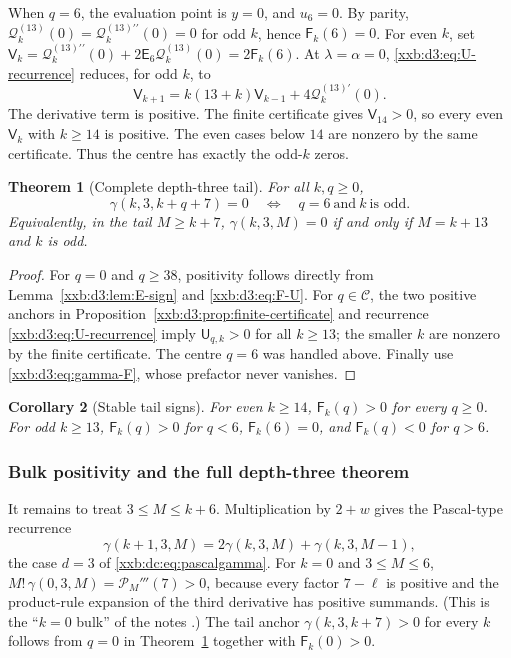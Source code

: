 \documentclass[11pt,a4paper]{article}
\numberwithin{equation}{section}
\newtheorem{theorem}{Theorem}[section]
\newtheorem{corollary}[theorem]{Corollary}
\theoremstyle{definition}
\theoremstyle{remark}
\theoremstyle{plain}
\begin{document}
When $q=6$, the evaluation point is $y=0$, and $u_6=0$.  By parity,
$\mathcal Q_k^{(13)}(0)=\mathcal Q_k^{(13)\prime\prime}(0)=0$ for odd $k$,
hence $\mathsf F_k(6)=0$.  For even $k$, set
$\mathsf V_k=\mathcal Q_k^{(13)\prime\prime}(0)+2\mathsf E_6\mathcal Q_k^{(13)}(0)=2\mathsf F_k(6)$.
At $\lambda=\alpha=0$, \eqref{xxb:d3:eq:U-recurrence} reduces, for odd $k$, to
\[
 \mathsf V_{k+1}=k(13+k)\mathsf V_{k-1}+4\mathcal Q_k^{(13)\prime}(0).
\]
The derivative term is positive.  The finite certificate gives
$\mathsf V_{14}>0$, so every even $\mathsf V_k$ with $k\geq14$ is positive.
The even cases below $14$ are nonzero by the same certificate.  Thus the
centre has exactly the odd-$k$ zeros.

\begin{theorem}[Complete depth-three tail]
\label{xxb:d3:thm:tail}
For all $k,q\geq0$,
\[
 \gamma(k,3,k+q+7)=0
 \quad\Longleftrightarrow\quad
 q=6\ \text{and}\ k\ \text{is odd}.
\]
Equivalently, in the tail $M\geq k+7$,
$\gamma(k,3,M)=0$ if and only if $M=k+13$ and $k$ is odd.
\end{theorem}

\begin{proof}
For $q=0$ and $q\geq38$, positivity follows directly from
Lemma~\ref{xxb:d3:lem:E-sign} and \eqref{xxb:d3:eq:F-U}.  For $q\in\mathcal C$,
the two positive anchors in Proposition~\ref{xxb:d3:prop:finite-certificate}
and recurrence \eqref{xxb:d3:eq:U-recurrence} imply $\mathsf U_{q,k}>0$ for
all $k\geq13$; the smaller $k$ are nonzero by the finite certificate.  The
centre $q=6$ was handled above.  Finally use \eqref{xxb:d3:eq:gamma-F}, whose
prefactor never vanishes.
\end{proof}

\begin{corollary}[Stable tail signs]
\label{xxb:d3:cor:stable-signs}
For even $k\geq14$, $\mathsf F_k(q)>0$ for every $q\geq0$.  For odd $k\geq13$,
$\mathsf F_k(q)>0$ for $q<6$, $\mathsf F_k(6)=0$, and $\mathsf F_k(q)<0$ for
$q>6$.
\end{corollary}

\subsubsection{Bulk positivity and the full depth-three theorem}\label{xxb:d3:sec:bulk}

It remains to treat $3\leq M\leq k+6$.  Multiplication by $2+w$ gives the
Pascal-type recurrence
\begin{equation}
 \label{xxb:d3:eq:gamma-k-recurrence}
 \gamma(k+1,3,M)=2\gamma(k,3,M)+\gamma(k,3,M-1),
\end{equation}
the case $d=3$ of \eqref{xxb:dc:eq:pascalgamma}.
For $k=0$ and $3\leq M\leq6$, $M!\,\gamma(0,3,M)=\mathcal P_M'''(7)>0$,
because every factor $7-\ell$ is positive and the product-rule expansion of
the third derivative has positive summands.  (This is the ``$k=0$ bulk'' of
the notes \cite{xxbd3-notes}.)  The tail anchor $\gamma(k,3,k+7)>0$ for every
$k$ follows from $q=0$ in Theorem~\ref{xxb:d3:thm:tail} together with
$\mathsf F_k(0)>0$.
\end{document}
